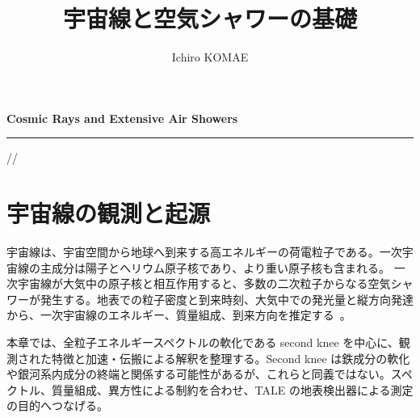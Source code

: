 \documentclass[book,paper=a4,fontsize=11pt]{jlreq}
\title{宇宙線と空気シャワーの基礎}
\author{Ichiro KOMAE}
\begin{document}
\frontmatter
\begin{titlepage}
    \sffamily
    \vspace*{4cm}

    \begin{flushleft}
        {\Large \textcolor{BookAccent}{\bfseries Cosmic Rays and Extensive Air Showers}}\par
        \vspace{1.5cm}

        \makeatletter
        {\fontsize{34pt}{42pt}\selectfont \bfseries \@title\par}
        \vspace{1.5cm}

        {\color{BookLine}\rule{0.8\textwidth}{1pt}}\par
        \vspace{1.5cm}

        {\Large \textcolor{BookAccent}{\bfseries \@author}}\par
        \makeatother
    \end{flushleft}

    \vfill

    \begin{center}
        \makeatletter
        {\large \textcolor{BookAccent}{\the\year/\two@digits{\month}/\two@digits{\day}}}
        \makeatother
    \end{center}
\end{titlepage}
\setcounter{tocdepth}{2}
\tableofcontents

\mainmatter

\chapter{宇宙線の観測と起源}\label{chap:cosmic_rays}
宇宙線は、宇宙空間から地球へ到来する高エネルギーの荷電粒子である。一次宇宙線の主成分は陽子とヘリウム原子核であり、より重い原子核も含まれる。
一次宇宙線が大気中の原子核と相互作用すると、多数の二次粒子からなる空気シャワーが発生する。地表での粒子密度と到来時刻、大気中での発光量と縦方向発達から、一次宇宙線のエネルギー、質量組成、到来方向を推定する~\cite{PDGCosmicRays,Stanev2004}。

本章では、全粒子エネルギースペクトルの軟化である second knee を中心に、観測された特徴と加速・伝搬による解釈を整理する。Second knee は鉄成分の軟化や銀河系内成分の終端と関係する可能性があるが、これらと同義ではない。スペクトル、質量組成、異方性による制約を合わせ、TALE の地表検出器による測定の目的へつなげる。
\end{document}
